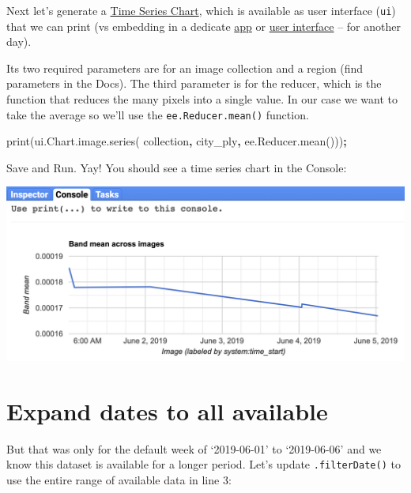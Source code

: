 \documentclass[]{book}
\newenvironment{Shaded}{\begin{snugshade}}{\end{snugshade}}
\newcommand{\AttributeTok}[1]{\textcolor[rgb]{0.77,0.63,0.00}{#1}}
\newcommand{\NormalTok}[1]{#1}
\newcommand{\OperatorTok}[1]{\textcolor[rgb]{0.81,0.36,0.00}{\textbf{#1}}}
\newcommand{\VariableTok}[1]{\textcolor[rgb]{0.00,0.00,0.00}{#1}}
\begin{document}
Next let's generate a \href{https://developers.google.com/earth-engine/charts_image_series}{Time Series Chart}, which is available as user interface (\texttt{ui}) that we can print (vs embedding in a dedicate \href{https://developers.google.com/earth-engine/apps}{app} or \href{https://developers.google.com/earth-engine/ui}{user interface} -- for another day).

Its two required parameters are for an image collection and a region (find parameters in the Docs). The third parameter is for the reducer, which is the function that reduces the many pixels into a single value. In our case we want to take the average so we'll use the \texttt{ee.Reducer.mean()} function.

\begin{Shaded}
\begin{Highlighting}[]
\AttributeTok{print}\NormalTok{(}\VariableTok{ui}\NormalTok{.}\VariableTok{Chart}\NormalTok{.}\VariableTok{image}\NormalTok{.}\AttributeTok{series}\NormalTok{(}
\NormalTok{  collection}\OperatorTok{,} 
\NormalTok{  city_ply}\OperatorTok{,} 
  \VariableTok{ee}\NormalTok{.}\VariableTok{Reducer}\NormalTok{.}\AttributeTok{mean}\NormalTok{()))}\OperatorTok{;}
\end{Highlighting}
\end{Shaded}

Save and Run. Yay! You should see a time series chart in the Console:

\includegraphics{images/gee_ts-chart_1-week.png}

\hypertarget{expand-dates-to-all-available}{%
\section{Expand dates to all available}\label{expand-dates-to-all-available}}

But that was only for the default week of `2019-06-01' to `2019-06-06' and we know this dataset is available for a longer period. Let's update \texttt{.filterDate()} to use the entire range of available data in line 3:
\end{document}
